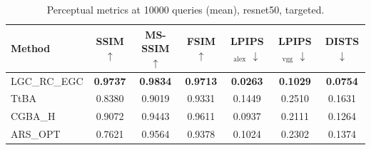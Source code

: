 \begin{table}[t]
\centering\footnotesize
\caption{Perceptual metrics at 10000 queries (mean), resnet50, targeted.}
\begin{tabular}{lcccccc}
\toprule
Method & SSIM $\uparrow$ & MS-SSIM $\uparrow$ & FSIM $\uparrow$ & LPIPS$_{\mathrm{alex}}$ $\downarrow$ & LPIPS$_{\mathrm{vgg}}$ $\downarrow$ & DISTS $\downarrow$ \\
\midrule
LGC\_RC\_EGC & \textbf{0.9737} & \textbf{0.9834} & \textbf{0.9713} & \textbf{0.0263} & \textbf{0.1029} & \textbf{0.0754} \\
TtBA & 0.8380 & 0.9019 & 0.9331 & 0.1449 & 0.2510 & 0.1631 \\
CGBA\_H & 0.9072 & 0.9443 & 0.9611 & 0.0937 & 0.2111 & 0.1264 \\
ARS\_OPT & 0.7621 & 0.9564 & 0.9378 & 0.1024 & 0.2302 & 0.1374 \\
\bottomrule
\end{tabular}
\end{table}
